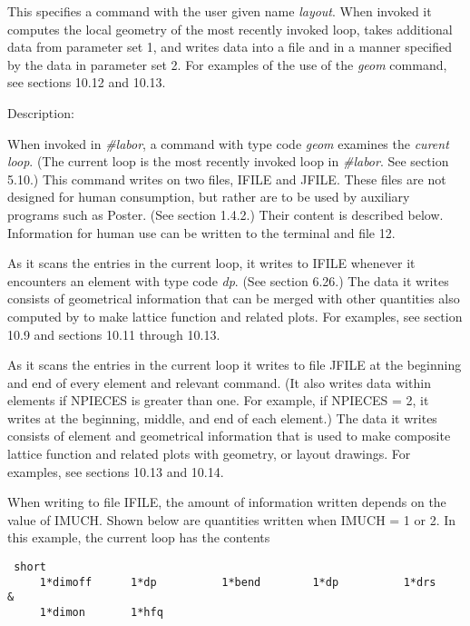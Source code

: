 This specifies a command with the user given name {\em layout}.  When invoked it computes the local geometry of the most recently invoked loop, takes additional data from parameter set 1, and writes data into a file and in a manner specified by the data in parameter set 2.  For examples of the use of the {\em geom} command, see sections 10.12 and 10.13.

\vspace{5mm}
Description:
\vspace{2mm}

When invoked in {\em \#labor}, a command with type code {\em geom}
examines the {\em curent loop}.  (The current loop is the most recently
invoked loop in {\em \#labor}.  See section 5.10.)  This command writes
on two files, IFILE and JFILE.  These files are not designed for human
consumption, but rather are to be used by auxiliary programs such as
Poster.  (See section 1.4.2.)  Their content is described below.  Information for human use can be written
to the terminal and file 12.

As it scans the entries in the current loop, it writes to IFILE whenever
it encounters an element with type code {\em dp}.  (See section 6.26.)
The data it writes consists of geometrical information that can be
merged with other quantities also computed by \Mary to make lattice
function and related plots.  For examples, see section 10.9 and sections
10.11 through 10.13.

As it scans the entries in the current loop it writes to file JFILE at
the beginning and end of every element and relevant command.  (It also
writes data within elements if NPIECES is greater than one.  For
example, if NPIECES = 2, it writes at the beginning, middle, and end of
each element.)  The data it writes consists of element and geometrical information
that is used to make composite lattice function and related plots with
geometry, or layout drawings.  For examples, see sections 10.13 and 10.14.

When writing to file IFILE, the amount of information written depends on
the value of IMUCH.  Shown below are quantities written when IMUCH = 1
or 2.  In this example, the current loop has the contents

\begin{footnotesize}
\begin{verbatim}
 short
     1*dimoff      1*dp          1*bend        1*dp          1*drs      &
     1*dimon       1*hfq
\end{verbatim}
\end{footnotesize}

